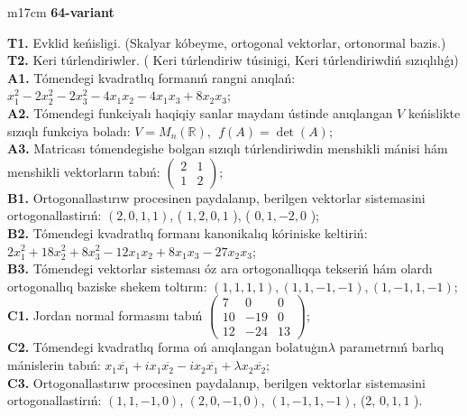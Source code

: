 \documentclass{article}
\begin{document}
\begin{tabular}{m{17cm}}
\textbf{64-variant}
\newline

\textbf{T1.} Evklid keńisligi. (Skalyar kóbeyme, ortogonal vektorlar, ortonormal bazis.) \\
\textbf{T2.} Keri túrlendiriwler. ( Keri túrlendiriw túsinigi,   Keri túrlendiriwdiń sızıqlılıǵı) \\
\textbf{A1.} Tómendegi kvadratlıq formanıń rangni anıqlań: \(x_{1}^{2} - 2x_{2}^{2} - 2x_{3}^{2} - 4x_{1}x_{2} - 4x_{1}x_{3} + 8x_{2}x_{3}\); \\
\textbf{A2.} Tómendegi funkciyalı haqiqiy sanlar maydanı ústinde anıqlangan \(V\) keńislikte sızıqlı funkciya boladı: \(V = M_{n}\left( \mathbb{R} \right),\ \ f(A) = \det(A)\); \\
\textbf{A3.} Matricası tómendegishe bolgan sızıqlı túrlendiriwdin menshikli mánisi hám menshikli vektorların tabıń: \(\begin{pmatrix} 2 & 1 \\ 1 & 2 \end{pmatrix}\); \\
\textbf{B1.} Ortogonallastırıw procesinen paydalanıp, berilgen vektorlar sistemasini ortogonallastirıń: \((2,0,1,1)\), ( \(1,2,0,1\) ), ( \(0,1, - 2,0\) ); \\
\textbf{B2.} Tómendegi kvadratlıq formanı kanonikalıq kóriniske keltiriń: \(2x_{1}^{2} + 18x_{2}^{2} + 8x_{3}^{2} - 12x_{1}x_{2} + 8x_{1}x_{3} - 27x_{2}x_{3}\); \\
\textbf{B3.} Tómendegi vektorlar sisteması óz ara ortogonallıqqa tekseriń hám olardı ortogonallıq baziske shekem toltırın: \((1,1,1,1),(1,1, - 1, - 1),(1, - 1,1, - 1)\); \\
\textbf{C1.} Jordan normal formasını tabıń \(\begin{pmatrix} 7 & 0 & 0 \\ 10 & - 19 & 0 \\ 12 & - 24 & 13 \end{pmatrix}\); \\
\textbf{C2.} Tómendegi kvadratlıq forma oń anıqlangan bolatuģın\(\lambda\) parametrnıń barlıq mánislerin tabıń: \(x_{1}\overline{x_{1}} + ix_{1}\overline{x_{2}} - ix_{2}\overline{x_{1}} + \lambda x_{2}\overline{x_{2}}\); \\
\textbf{C3.} Ortogonallastırıw procesinen paydalanıp, berilgen vektorlar sistemasini ortogonallastirıń: \((1,1, - 1,0)\), \((2,0, - 1,0)\), \((1, - 1,1, - 1)\), (2, \(0,1,1\) ). \\

\end{tabular}
\vspace{1cm}
\end{document}
